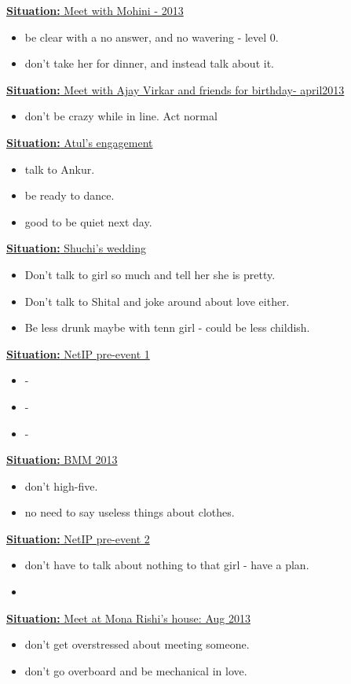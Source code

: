 \documentclass[11pt]{article}
\newcommand{\newSituation}[1]{\underline{\textbf{Situation:} #1} }
\begin{document}
\newSituation{Meet with Mohini - 2013} 
\begin{itemize} 
\item be clear with a no answer, and no wavering - level 0. 
\item don’t take her for dinner, and instead talk about it. 
\end{itemize} 

\newSituation{Meet with Ajay Virkar and friends for birthday- april2013} 
\begin{itemize} 
\item don't be crazy while in line. Act normal 
\end{itemize} 

\newSituation{Atul's engagement}
\begin{itemize}
\item talk to Ankur.
\item be ready to dance.
\item good to be quiet next day.
\end{itemize} 

\newSituation{Shuchi's wedding} 
\begin{itemize} 
\item Don't talk to girl so much and tell her she is pretty. 
\item Don't talk to Shital and joke around about love either. 
\item Be less drunk maybe with tenn girl - could be less childish. 
\end{itemize} 

\newSituation{NetIP pre-event 1}
\begin{itemize}
\item -
\item - 
\item - 
\end{itemize}

\newSituation{BMM 2013} 
\begin{itemize} 
\item don't high-five. 
\item no need to say useless things about clothes.
\end{itemize} 

\newSituation{NetIP pre-event 2}
\begin{itemize}
\item don't have to talk about nothing to that girl - have a plan. 
\item 
\end{itemize} 

\newSituation{Meet at Mona Rishi's house: Aug 2013}
\begin{itemize}
\item don't get overstressed about meeting someone.
\item don't go overboard and be mechanical in love. 
\end{itemize} 
\end{document}
